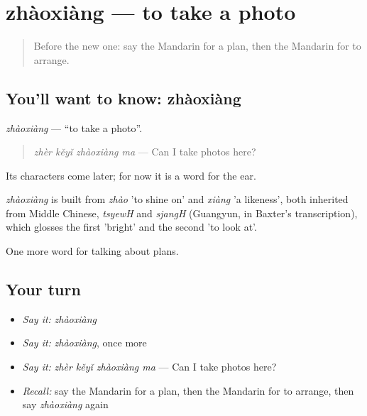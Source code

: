 \section[zhàoxiàng]{zhàoxiàng — to take a photo}

\label{lesson:ZH-C207-zhaoxiang}



\begin{quote}
Before the new one: say the Mandarin for a plan, then the Mandarin for to arrange.
\end{quote}

\subsection*{You'll want to know: zhàoxiàng}
\emph{zhàoxiàng} — \textquotedblleft{}to take a photo\textquotedblright{}.

\begin{quote}
\emph{zhèr kěyǐ zhàoxiàng ma} — Can I take photos here?
\end{quote}

Its characters come later; for now it is a word for the ear.

\begin{cousinweb}
\emph{zhàoxiàng} is built from \emph{zhào} 'to shine on' and \emph{xiàng} 'a likeness', both inherited from Middle Chinese, \emph{tsyewH} and \emph{sjangH} (Guangyun, in Baxter's transcription), which glosses the first 'bright' and the second 'to look at'.
\end{cousinweb}

\begin{grammarlens}[title={What you've built}]
One more word for talking about plans.
\end{grammarlens}

\subsection*{Your turn}
\begin{itemize}
\raggedright
  \item \emph{Say it:} \emph{zhàoxiàng}
  \item \emph{Say it:} \emph{zhàoxiàng}, once more
  \item \emph{Say it:} \emph{zhèr kěyǐ zhàoxiàng ma} — Can I take photos here?
  \item \emph{Recall:} say the Mandarin for a plan, then the Mandarin for to arrange, then say \emph{zhàoxiàng} again
\end{itemize}

